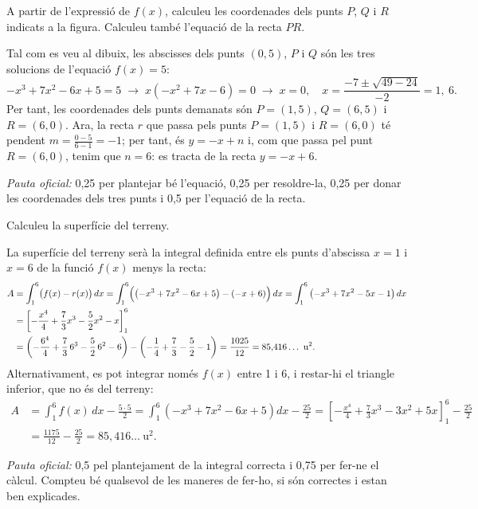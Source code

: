 \begin{apartats}

A partir de l'expressió de $f(x)$, calculeu les coordenades dels punts $P$, $Q$ i $R$ indicats a la figura.
Calculeu també l'equació de la recta $PR$.

\begin{solucio}
Tal com es veu al dibuix, les abscisses dels punts $(0,5)$, $P$ i $Q$ són les tres solucions de l'equació
$f(x)=5$:
\[
-x^3+7x^2-6x+5=5\;\rightarrow\;x\left(-x^2+7x-6\right)=0\;\rightarrow\;x=0,\quad
x=\frac{-7\pm\sqrt{49-24}}{-2}=1,\ 6 .
\]
Per tant, les coordenades dels punts demanats són $P=(1,5)$, $Q=(6,5)$ i $R=(6,0)$. Ara, la recta $r$ que passa
pels punts $P=(1,5)$ i $R=(6,0)$ té pendent $m=\frac{0-5}{6-1}=-1$; per tant, és $y=-x+n$ i, com que passa pel
punt $R=(6,0)$, tenim que $n=6$: es tracta de la recta $y=-x+6$.

\textit{Pauta oficial:} 0,25 per plantejar bé l'equació, 0,25 per resoldre-la, 0,25 per donar les coordenades
dels tres punts i 0,5 per l'equació de la recta.
\end{solucio}

Calculeu la superfície del terreny.

\begin{solucio}
La superfície del terreny serà la integral definida entre els punts d'abscissa $x=1$ i $x=6$ de la funció
$f(x)$ menys la recta:
\begin{align*}
A&=\int_1^6\bigl(f(x)-r(x)\bigr)\,dx=\int_1^6\Bigl(\left(-x^3+7x^2-6x+5\right)-(-x+6)\Bigr)\,dx
=\int_1^6\left(-x^3+7x^2-5x-1\right)dx\\
&=\left[-\frac{x^4}{4}+\frac73x^3-\frac52x^2-x\right]_1^6\\
&=\left(-\frac{6^4}{4}+\frac73\,6^3-\frac52\,6^2-6\right)-\left(-\frac14+\frac73-\frac52-1\right)
=\frac{1025}{12}=85{,}416\ldots\ \text{u}^2 .
\end{align*}
Alternativament, es pot integrar només $f(x)$ entre 1 i 6, i restar-hi el triangle inferior, que no és del
terreny:
\begin{align*}
A&=\int_1^6f(x)\,dx-\frac{5\cdot5}{2}=\int_1^6\left(-x^3+7x^2-6x+5\right)dx-\frac{25}{2}
=\left[-\frac{x^4}{4}+\frac73x^3-3x^2+5x\right]_1^6-\frac{25}{2}\\
&=\frac{1175}{12}-\frac{25}{2}=85{,}416\ldots\ \text{u}^2 .
\end{align*}

\textit{Pauta oficial:} 0,5 pel plantejament de la integral correcta i 0,75 per fer-ne el càlcul. Compteu bé
qualsevol de les maneres de fer-ho, si són correctes i estan ben explicades.
\end{solucio}

\end{apartats}
